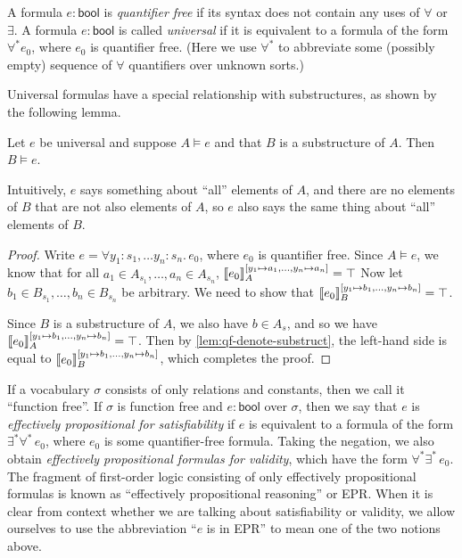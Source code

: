 A formula $e : \mathsf{bool}$ is \emph{quantifier free}
  if its syntax does not contain any uses of $\forall$ or $\exists$.
A formula $e : \mathsf{bool}$ is called \emph{universal}
  if it is equivalent to a formula of the form $\forall^* e_0$, where $e_0$ is quantifier free.
(Here we use $\forall^*$ to abbreviate some (possibly empty) sequence of $\forall$ quantifiers over unknown sorts.)

Universal formulas have a special relationship with substructures, as shown by the following lemma.
\begin{lemma}\label{lem:univ-model-substruct}
  Let $e$ be universal and suppose $A\models e$ and that $B$ is a substructure of $A$.
  Then $B\models e$.

  Intuitively, $e$ says something about ``all'' elements of $A$, and
  there are no elements of $B$ that are not also elements of $A$, so
  $e$ also says the same thing about ``all'' elements of $B$.
\end{lemma}
\begin{proof}
  Write $e = \forall y_1 : s_1,\dots y_n : s_n.\, e_0$, where $e_0$ is quantifier free.
  Since $A\models e$, we know that for all $a_1\in A_{s_1}, \dots, a_n\in A_{s_n}$,
  $\llbracket{e_0}\rrbracket_A^{[y_1\mapsto a_1, \dots, y_n\mapsto a_n]} = \top$
  Now let $b_1\in B_{s_1}, \dots, b_n\in B_{s_n}$ be arbitrary.
  We need to show that $\llbracket{e_0}\rrbracket_B^{[y_1\mapsto b_1, \dots, y_n\mapsto b_n]} = \top$.

  Since $B$ is a substructure of $A$, we also have $b\in A_s$,
  and so we have $\llbracket{e_0}\rrbracket_A^{[y_1\mapsto b_1, \dots, y_n\mapsto b_n]} = \top$.
  Then by \cref{lem:qf-denote-substruct}, the left-hand side is equal to
  $\llbracket{e_0}\rrbracket_B^{[y_1\mapsto b_1, \dots, y_n\mapsto b_n]}$, which completes the proof.
\end{proof}


%
If a vocabulary $\sigma$ consists of only relations and constants,
  then we call it ``function free''.
If $\sigma$ is function free and $e : \mathsf{bool}$ over $\sigma$,
  then we say that $e$ is \emph{effectively propositional for satisfiability}
  if $e$ is equivalent to a formula of the form $\exists^*\forall^*\, e_0$,
  where $e_0$ is some quantifier-free formula.
Taking the negation, we also obtain \emph{effectively propositional formulas for validity},
  which have the form $\forall^*\exists^*\, e_0$.
The fragment of first-order logic consisting of only effectively propositional formulas
  is known as ``effectively propositional reasoning'' or EPR.
When it is clear from context whether we are talking about satisfiability or validity,
  we allow ourselves to use the abbreviation ``$e$ is in EPR'' to mean one of the two notions above.

